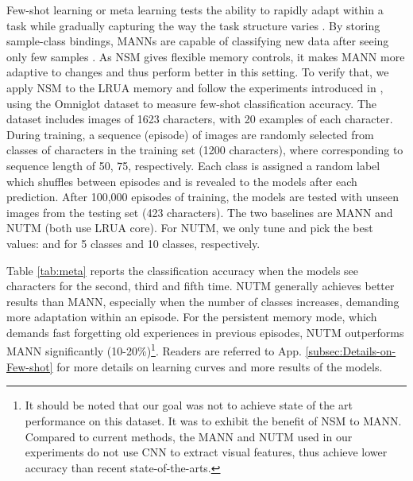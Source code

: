 \documentclass[english]{article}
\renewcommand{\cite}{\citep}
\begin{document}
Few-shot learning or meta learning tests the ability to rapidly adapt
within a task while gradually capturing the way the task structure
varies \cite{thrun1998lifelong}. By storing sample-class bindings,
MANNs are capable of classifying new data after seeing only few samples
 \cite{santoro2016meta}. As NSM gives flexible memory controls, it
makes MANN more adaptive to changes and thus perform better in this
setting. To verify that, we apply NSM to the LRUA memory and follow
the experiments introduced in \citet{santoro2016meta} , using the
Omniglot dataset to measure few-shot classification accuracy. The
dataset includes images of 1623 characters, with 20 examples of each
character. During training, a sequence (episode) of images are randomly
selected from  classes of characters in the training set (1200
characters), where  corresponding to sequence length of 50,
75, respectively. Each class is assigned a random label which shuffles
between episodes and is revealed to the models after each prediction.
After 100,000 episodes of training, the models are tested with unseen
images from the testing set (423 characters). The two baselines are
MANN and NUTM (both use LRUA core). For NUTM, we only tune  and
pick the best values:  and  for 5 classes and 10 classes,
respectively. 

Table \ref{tab:meta} reports the classification accuracy when the
models see characters for the second, third and fifth time. NUTM generally
achieves better results than MANN, especially when the number of classes
increases, demanding more adaptation within an episode. For the persistent
memory mode, which demands fast forgetting old experiences in previous
episodes, NUTM outperforms MANN significantly (10-20\%)\footnote{It should be noted that our goal was not to achieve state of the art
performance on this dataset. It was to exhibit the benefit of NSM
to MANN. Compared to current methods, the MANN and NUTM used in our
experiments do not use CNN to extract visual features, thus achieve
lower accuracy than recent state-of-the-arts. }. Readers are referred to App. \ref{subsec:Details-on-Few-shot} for
more details on learning curves and more results of the models. 
\end{document}
